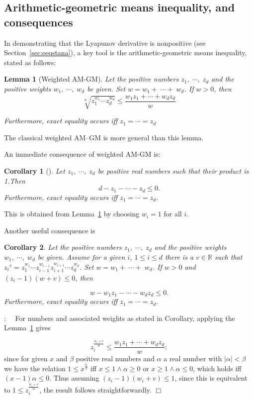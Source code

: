 \documentclass[a4paper]{article}
\newcommand{\edem}{\hfill $\Box$ }
\newtheorem{lem}{Lemma}[section]
\newtheorem{cor}{Corollary}[section]
\begin{document}
{\subsection{Arithmetic-geometric means inequality, and consequences}In demonstrating that the Lyapunov derivative is nonpositive (see Section~\eqref{sec:eeqstana}), a key tool is the arithmetic-geometric means inequality, stated as follows: 

\begin{lem}[Weighted AM-GM]\label{lem.agmi}
	Let the positive numbers $z_1,\;\cdots,\;z_d$ and the positive weights $w_1,\;\cdots,\;w_d$ be given. Set $w = w_1+\;\cdots+\;w_d$. If $w>0$, then  
	$$\sqrt[w]{z_1^{w_1}\cdots z_d^{w_d}} \leqslant \frac{w_1z_1+\cdots+w_dz_d}{w}$$
	
	Furthermore, exact equality occurs iff $z_1=\cdots=z_d$
\end{lem}

\noindent The classical weighted AM--GM is more general than this lemma. 

\noindent An immediate consequence of weighted AM-GM is:

\begin{cor}[\cite{McCluskey07}]\label{cor.agmi} Let $z_1,\;\cdots,\;z_d$ be positive real numbers such that their product is 1.Then
	$$d - z_1 -\cdots - z_d\leqslant 0.$$  Furthermore, exact equality  occurs iff $z_1=\cdots=z_d$.
\end{cor}

\noindent This is obtained from Lemma~\ref{lem.agmi} by choosing $w_i=1$ for all  $i$.

\noindent Another useful consequence  is 

\begin{cor}\label{cor.agmi0} Let the positive numbers $z_1,\;\cdots,\;z_d$ and the positive weights $w_1,\;\cdots,\;w_d$ be given. Assume for a given $i$, $1\leq i \leq d$ there is a $v\in\mathbb R$ such that ${z_i}^v=z_1^{w_1}\cdots z_{i-1}^{w_{i-1}}z_{i+1}^{w_{i+1}}\cdots z_d^{w_d}$.  Set $w = w_1+\;\cdots+\;w_d$. If $w>0$ and $(z_i-1)(w+v)\leqslant 0$, then
	
	$$w - w_1z_1 -\cdots - w_dz_d\leqslant 0.$$  Furthermore, exact equality  occurs iff $z_1=\cdots=z_d$.
\end{cor}
:~~ For numbers and associated weights as stated in Corollary, applying the Lemma~\ref{lem.agmi} gives

$$z_i^{\frac{w_i+v}{w}}\leqslant\frac{w_1z_1+\cdots+w_dz_d}{w};$$ since for given $x$ and $\beta$ positive real numbers and $\alpha$ a real number with $|\alpha|<\beta$ we have the relation $1\leqslant x^{\frac{\alpha}{\beta}}$ iff $x\leqslant 1\wedge\alpha\geqslant0$ or $x\geqslant 1\wedge\alpha\leqslant0$, which holds iff $(x-1)\alpha\leq0$. Thus assuming  $(z_i-1)(w_i+v)\leqslant 1$,  since this is equivalent to $1\leqslant z_i^{\frac{w_i+v}{w}}$, the  result follows straightforwardly. \edem

}
\end{document}
